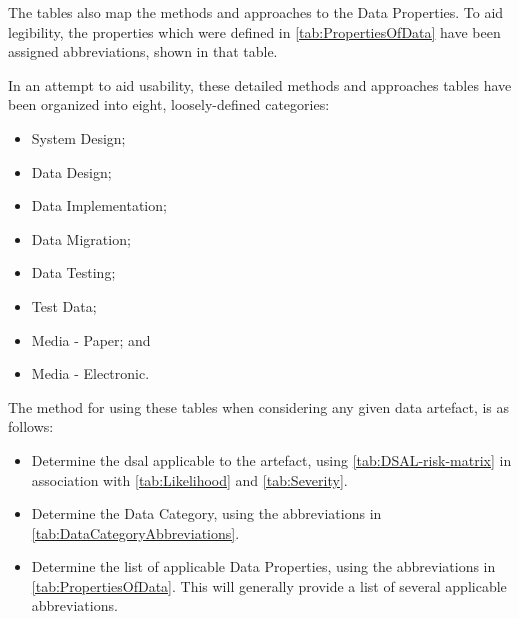 The tables also map the methods and approaches to the Data Properties. To aid legibility, the properties
which were defined in \autoref{tab:PropertiesOfData} have been assigned abbreviations\cbstart, shown in that table.\cbend

In an attempt to aid usability, these detailed methods and approaches tables have been organized into eight, loosely-defined categories:
\begin{itemize}
  \item System Design;
  \item Data Design;
  \item Data Implementation;
  \item Data Migration;
  \item Data Testing;
  \item Test Data;
  \item Media - Paper; and 
  \item Media - Electronic.
\end{itemize}

The method for using these tables when considering any given data artefact, is as follows:
\begin{itemize}
    \item Determine the \gls{dsal} applicable to the artefact, using \autoref{tab:DSAL-risk-matrix} in association with \autoref{tab:Likelihood} and \autoref{tab:Severity}.
    \item Determine the Data Category, using the abbreviations in \autoref{tab:DataCategoryAbbreviations}.
    \item Determine the list of applicable Data Properties, using the abbreviations in \autoref{tab:PropertiesOfData}. This will generally provide a list of several applicable abbreviations.
\end{itemize}

